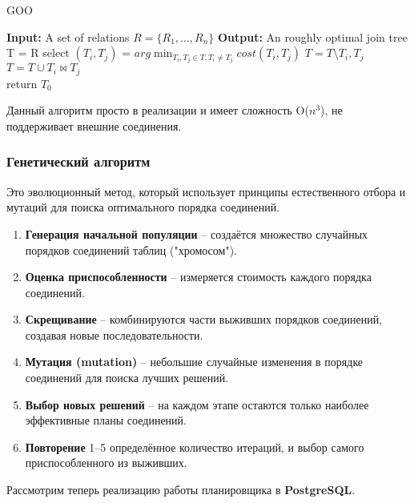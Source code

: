 \documentclass[12pt]{article}
\begin{document}
\begin{flushleft}
\begin{algorithm}
    GOO
    \begin{algorithmic}[1]
        \State \textbf{Input:} A set of relations $R = \{R_1, \dots, R_n\}$
        \State \textbf{Output:} An roughly optimal join tree
        \State T = R
            \State select $(T_i,T_j)$ = $arg \min_{T_i, T_j \in T, T_i \neq T_j} cost(T_i, T_j)$
            \State $T = T \setminus {T_i, T_j}$
            \State $T = T \cup {T_i \Join T_j}$
        \EndWhile \\
        return $T_0$
    \end{algorithmic}
\end{algorithm}

Данный алгоритм просто в реализации и имеет сложность O($n^3$), не поддерживает
внешние соединения.

\centering \subsubsection*{\textbf{Генетический алгоритм}}
\raggedright  

Это эволюционный метод, который использует принципы естественного отбора и мутаций для поиска оптимального порядка соединений.  

\begin{enumerate}
    \item \textbf{Генерация начальной популяции} – создаётся множество случайных порядков соединений таблиц ("хромосом").
    \item \textbf{Оценка приспособленности} – измеряется стоимость каждого порядка соединений.
    \item \textbf{Скрещивание} – комбинируются части выживших порядков соединений, создавая новые последовательности.
    \item \textbf{Мутация (mutation)} – небольшие случайные изменения в порядке соединений для поиска лучших решений.
    \item \textbf{Выбор новых решений} – на каждом этапе остаются только наиболее эффективные планы соединений.
    \item \textbf{Повторение} 1--5 определённое количество итераций, и выбор самого приспособленного из выживших.
\end{enumerate}

Рассмотрим теперь реализацию работы планировщика в \textbf{PostgreSQL}.


\end{flushleft}
\end{document}
